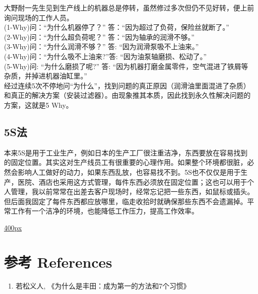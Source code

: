 \documentclass[]{article}
\providecommand{\tightlist}{%
  \setlength{\itemsep}{0pt}\setlength{\parskip}{0pt}}
\begin{document}
大野耐一先生见到生产线上的机器总是停转，虽然修过多次但仍不见好转，便上前询问现场的工作人员。\\
(1-Why)问：``为什么机器停了？'' 答：``因为超过了负荷，保险丝就断了。''\\
(2-Why)问：``为什么超负荷呢？'' 答：``因为轴承的润滑不够。''\\
(3-Why)问：``为什么润滑不够？'' 答: ``因为润滑泵吸不上油来。''\\
(4-Why)问：``为什么吸不上油来?''答: ``因为油泵轴磨损、松动了。''\\
(5-Why)问: ``为什么磨损了呢?'' 答:
``因为机器打磨金属零件，空气混进了铁屑等杂质，并掉进机器油缸里。''\\
经过连续5次不停地问``为什么''，找到问题的真正原因（润滑油里面混进了杂质）和真正的解决方案（安装过滤器）。由现象推其本质，因此找到永久性解决问题的方案，这就是5
Why。

\hypertarget{sux6cd5}{%
\subsection{5S法}\label{sux6cd5}}

本来5S是用于工业生产，例如日本的生产工厂很注重洁净，东西要放在容易找到的固定位置。其实这对生产线员工有很重要的心理作用。如果整个环境都很脏，必然会影响人工做好的动力，如果东西乱放，也容易找不到。5S也不仅仅是用于生产，医院、酒店也采用这方式管理，每件东西必须放在固定位置；这也可以用于个人管理，我以前常常在出差去客户现场时，经常忘记把一些东西，如鼠标或插头。但后面我固定了每件东西都应放哪里，临走收拾时就确保那些东西不会遗漏掉。平常工作有一个洁净的环境，也能降低工作压力，提高工作效率。

\href{文件:5S_五常法_Screenshot_2023-08-03_211606.jpg}{400px}

\hypertarget{ux53c2ux8003-references}{%
\section{参考 References}\label{ux53c2ux8003-references}}

\begin{enumerate}
\tightlist
\item
  若松义人, 《为什么是丰田：成为第一的方法和7个习惯》
\end{enumerate}
\end{document}
